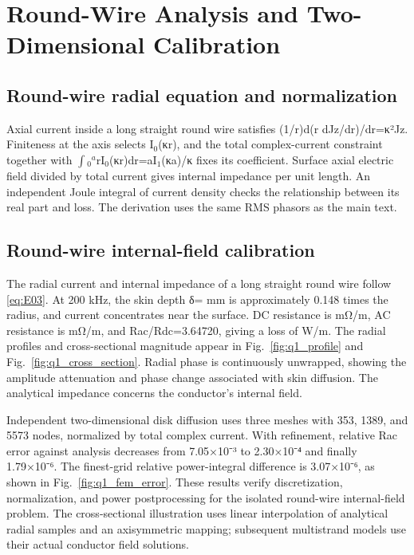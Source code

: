 \section{Round-Wire Analysis and Two-Dimensional Calibration}
\label{chapter:03}

\hypertarget{03.round_derivation.heading}{}
\subsection{Round-wire radial equation and normalization}

\hypertarget{03.round_derivation.p1}{}
Axial current inside a long straight round wire satisfies (1/r)d(r dJz/dr)/dr=κ²Jz. Finiteness at the axis selects I\(_0\)(κr), and the total complex-current constraint together with \(\int\)\(_0\)\(^a\)rI\(_0\)(κr)dr=aI\(_1\)(κa)/κ fixes its coefficient. Surface axial electric field divided by total current gives internal impedance per unit length. An independent Joule integral of current density checks the relationship between its real part and loss. The derivation uses the same RMS phasors as the main text.

\hypertarget{03.analytic.heading}{}
\subsection{Round-wire internal-field calibration}

\hypertarget{03.analytic.p1}{}
The radial current and internal impedance of a long straight round wire follow \eqref{eq:E03}. At 200 kHz, the skin depth δ= mm is approximately 0.148 times the radius, and current concentrates near the surface. DC resistance is  mΩ/m, AC resistance is  mΩ/m, and Rac/Rdc=3.64720, giving a loss of  W/m. The radial profiles and cross-sectional magnitude appear in Fig.~\ref{fig:q1_profile} and Fig.~\ref{fig:q1_cross_section}. Radial phase is continuously unwrapped, showing the amplitude attenuation and phase change associated with skin diffusion. The analytical impedance concerns the conductor's internal field.

\hypertarget{03.analytic.p2}{}
Independent two-dimensional disk diffusion uses three meshes with 353, 1389, and 5573 nodes, normalized by total complex current. With refinement, relative Rac error against analysis decreases from 7.05×10⁻³ to 2.30×10⁻⁴ and finally 1.79×10⁻⁶. The finest-grid relative power-integral difference is 3.07×10⁻⁶, as shown in Fig.~\ref{fig:q1_fem_error}. These results verify discretization, normalization, and power postprocessing for the isolated round-wire internal-field problem. The cross-sectional illustration uses linear interpolation of analytical radial samples and an axisymmetric mapping; subsequent multistrand models use their actual conductor field solutions.


